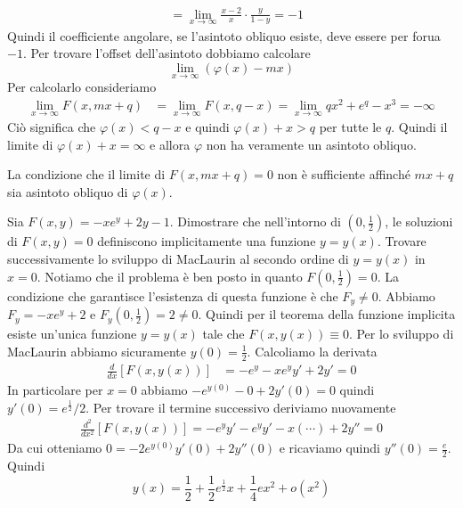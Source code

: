 \documentclass[a4paper]{article}
\begin{document}
\begin{radioactive}
\begin{snippetexample}{}
\begin{align*}
        &= \lim_{x\to \infty} \frac{x-2}{x} \cdot \frac{y}{1-y} = -1
    \end{align*}
    Quindi il coefficiente angolare, se l'asintoto obliquo esiste, deve essere per forua \(-1\).
    Per trovare l'offset dell'asintoto dobbiamo calcolare
    \[
        \lim_{x\to \infty} (\varphi(x) - mx)
    \]
    Per calcolarlo consideriamo
    \begin{align*}
        \lim_{x\to \infty} F(x, mx+q)
        &= \lim_{x\to \infty} F(x, q-x) 
        = \lim_{x\to \infty} qx^2 + e^q - x^3 = - \infty
    \end{align*}
    Ciò significa che \(\varphi(x) < q-x\) e quindi \(\varphi(x) + x > q\) per tutte le \(q\).
    Quindi il limite di \(\varphi(x) + x = \infty\) e allora \(\varphi\)
    non ha veramente un asintoto obliquo.
\end{snippetexample}
\end{radioactive}

\begin{radioactive}
La condizione che il limite di \(F(x, mx+q) = 0\)
non è sufficiente affinché \(mx+q\) sia asintoto obliquo di \(\varphi(x)\).
\end{radioactive}

\begin{radioactive}
\begin{snippetexercise}{}
    Sia \(F(x,y) = -xe^y + 2y - 1\).
    Dimostrare che nell'intorno di \((0, \frac12)\), le soluzioni di
    \(F(x,y)=0\) definiscono implicitamente una funzione \(y=y(x)\).
    Trovare successivamente lo sviluppo di MacLaurin al secondo ordine di \(y=y(x)\) in \(x=0\).
    Notiamo che il problema è ben posto in quanto \(F(0, \frac12) = 0\).
    La condizione che garantisce l'esistenza di questa funzione
    è che \(F_y \neq 0\).
    Abbiamo \(F_y = -xe^y + 2\) e \(F_y(0, \frac12) = 2 \neq 0\).
    Quindi per il teorema della funzione implicita esiste un'unica funzione \(y=y(x)\)
    tale che \(F(x,y(x)) \equiv 0\).
    Per lo sviluppo di MacLaurin abbiamo sicuramente
    \(y(0) = \frac12\). Calcoliamo la derivata
    \begin{align*}
        \frac{d}{dx} \left[F(x,y(x))\right]
        &= -e^y - xe^yy' + 2y' = 0
    \end{align*}
    In particolare per \(x=0\) abbiamo \(-e^{y(0)} - 0 + 2y'(0) = 0\)
    quindi \(y'(0) = e^\frac12 / 2\).
    Per trovare il termine successivo deriviamo nuovamente
    \begin{align*}
        \frac{d^2}{dx^2}\left[
            F(x,y(x))
        \right] = -e^y y' - e^yy' - x(\cdots) + 2y'' = 0
    \end{align*}
    Da cui otteniamo \(0 = -2e^{y(0)}y'(0) + 2y''(0)\)
    e ricaviamo quindi \(y''(0) = \frac{e}{2}\).
    Quindi
    \[
        y(x) = \frac12 + \frac12 e^{\frac12}x + \frac14 ex^2 + o(x^2)
    \]
\end{snippetexercise}
\end{radioactive}
\end{document}
